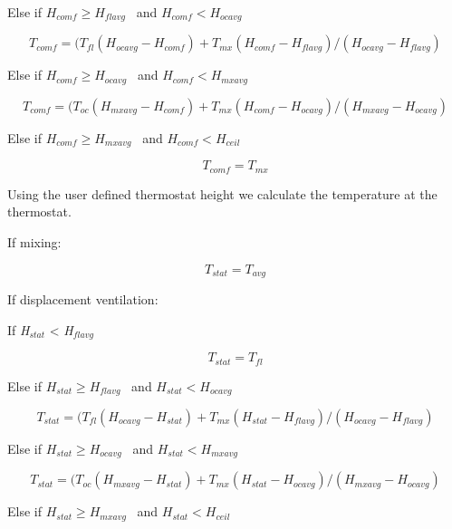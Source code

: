 Else if \({H_{comf}} \ge {H_{flavg}}\) ~and \({H_{comf}} < {H_{ocavg}}\)

\begin{equation}
{T_{comf}} = ({T_{fl}}({H_{ocavg}} - {H_{comf}}) + {T_{mx}}({H_{comf}} - {H_{flavg}})/({H_{ocavg}} - {H_{flavg}})
\end{equation}

Else if \({H_{comf}} \ge {H_{ocavg}}\) ~and \({H_{comf}} < {H_{mxavg}}\)

\begin{equation}
{T_{comf}} = ({T_{oc}}({H_{mxavg}} - {H_{comf}}) + {T_{mx}}({H_{comf}} - {H_{ocavg}})/({H_{mxavg}} - {H_{ocavg}})
\end{equation}

Else if \({H_{comf}} \ge {H_{mxavg}}\) ~and \({H_{comf}} < {H_{ceil}}\)

\begin{equation}
{T_{comf}} = {T_{mx}}
\end{equation}

Using the user defined thermostat height we calculate the temperature at the thermostat.

If mixing:

\begin{equation}
{T_{stat}} = {T_{avg}}
\end{equation}

If displacement ventilation:

If \emph{H\(_{stat}\)} \textless{} \emph{H\(_{flavg}\)}

\begin{equation}
{T_{stat}} = {T_{fl}}
\end{equation}

Else if \({H_{stat}} \ge {H_{flavg}}\) ~and \({H_{stat}} < {H_{ocavg}}\)

\begin{equation}
{T_{stat}} = ({T_{fl}}({H_{ocavg}} - {H_{stat}}) + {T_{mx}}({H_{stat}} - {H_{flavg}})/({H_{ocavg}} - {H_{flavg}})
\end{equation}

Else if \({H_{stat}} \ge {H_{ocavg}}\) ~and \({H_{stat}} < {H_{mxavg}}\)

\begin{equation}
{T_{stat}} = ({T_{oc}}({H_{mxavg}} - {H_{stat}}) + {T_{mx}}({H_{stat}} - {H_{ocavg}})/({H_{mxavg}} - {H_{ocavg}})
\end{equation}

Else if \({H_{stat}} \ge {H_{mxavg}}\) ~and \({H_{stat}} < {H_{ceil}}\)


